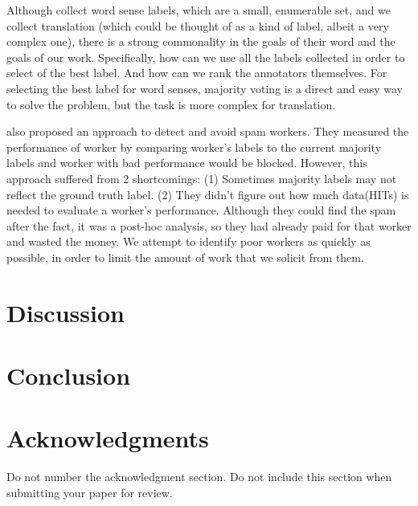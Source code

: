 \documentclass[11pt]{article}
\begin{document}
Although  collect word sense labels, which are a small, enumerable set, and we collect translation (which could be thought of as a kind of label, albeit a very complex one), there is a strong commonality in the goals of their word and the goals of our work.  Specifically, how can we use all the labels collected in order to select of the best label.  And how can we rank the annotators themselves.  For selecting the best label for word senses, majority voting is a direct and easy way to solve the problem, but the task is more complex for translation. 

 also proposed an approach to detect and avoid spam workers. 
They measured the performance of worker by comparing worker's labels to the current majority labels and worker with bad performance would be blocked. However, this approach suffered from 2 shortcomings: (1) Sometimes majority labels may not reflect the ground truth label. (2) They didn't figure out  how much data(HITs) is needed to evaluate a worker's performance. Although they could find the spam after the fact, it was a post-hoc analysis, so they had already paid for that worker and wasted the money.  We attempt to identify poor workers as quickly as possible, in order to limit the amount of work that we solicit from them.

\section{Discussion}
\section{Conclusion}
\section*{Acknowledgments}

Do not number the acknowledgment section. Do not include this section when submitting your paper for review.



\end{document}
